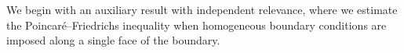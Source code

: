 \documentclass[10pt,a4paper]{article}
\begin{document}






















We begin with an auxiliary result with independent relevance, where we estimate the Poincar\'e--Friedrichs inequality when homogeneous boundary conditions are imposed along a single face of the boundary. 
\end{document}
